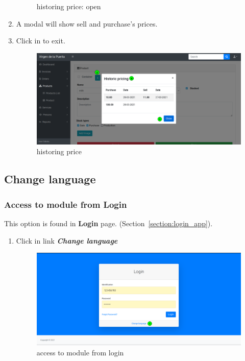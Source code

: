 \documentclass[a4paper,11pt]{refart}
\begin{document}
\begin{enumerate}
\begin{figure}[H]
		\caption{historing price: open}
		\label{fig:historing_price-open}
	\end{figure}
	\item A modal will show sell and purchase's prices.
	\item Click in  to exit.
	\begin{figure}[H]\centering
		\includegraphics[width=\textwidth]{images/historing_price-modal.png}
		\caption{historing price}
		\label{fig:historing_price-modal}
	\end{figure}
	
\end{enumerate}	

\subsection{Change language}\label{section:change_language}
\subsubsection{Access to module from Login}
This option is found in \textbf{Login} page. (Section~\ref{section:login_app}).
\begin{enumerate}
	\item Click in link \textbf{\emph{Change language}}
	\begin{figure}[H]\centering
		\includegraphics[width=\textwidth]{images/change_language-login.png}
		\caption{access to module from login}
		\label{fig:change_language-login}
	\end{figure}
\end{enumerate}
\end{document}
